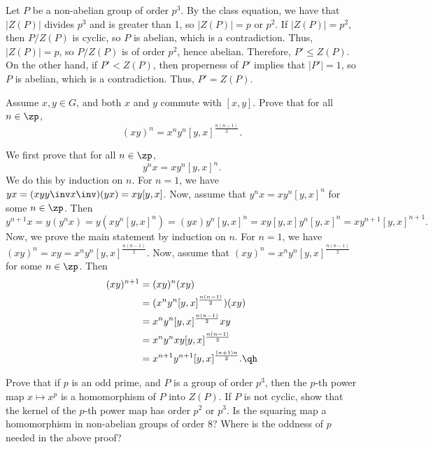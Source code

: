 \begin{sol}
    Let $P$ be a non-abelian group of order $p^3$. By the class equation, we have that $|Z(P)|$ divides $p^3$ and is greater than 1, so $|Z(P)| = p$ or $p^2$. If $|Z(P)| = p^2$, then $P/Z(P)$ is cyclic, so $P$ is abelian, which is a contradiction. Thus, $|Z(P)| = p$, so $P/Z(P)$ is of order $p^2$, hence abelian. Therefore, $P' \leq Z(P)$. On the other hand, if $P' < Z(P)$, then properness of $P'$ implies that $|P'| = 1$, so $P$ is abelian, which is a contradiction. Thus, $P' = Z(P)$.
\end{sol}

\begin{exercise}\label{ex5.4.8}
    Assume $x, y \in G$, and both $x$ and $y$ commute with $[x, y]$. Prove that for all $n \in \zp$,
    \[(xy)^n = x^n y^n [y, x]^{\frac{n(n-1)}{2}}.\]
\end{exercise}

\begin{sol}
    We first prove that for all $n \in \zp$,
    \[y^nx = xy^n [y, x]^n.\]
    We do this by induction on $n$. For $n = 1$, we have $yx = (xyy\inv x\inv)(yx) = xy[y, x]$. Now, assume that $y^nx = xy^n [y, x]^n$ for some $n \in \zp$. Then
    \[y^{n+1}x = y(y^nx) = y(xy^n [y, x]^n) = (yx)y^n [y, x]^n = xy[y, x]y^n [y, x]^n = xy^{n+1} [y, x]^{n+1}.\]
    Now, we prove the main statement by induction on $n$. For $n = 1$, we have $(xy)^n = xy = x^n y^n [y, x]^{\frac{n(n-1)}{2}}$. Now, assume that $(xy)^n = x^n y^n [y, x]^{\frac{n(n-1)}{2}}$ for some $n \in \zp$. Then
    \begin{align*}
        (xy)^{n+1} & = (xy)^n (xy) \\
        & = (x^n y^n [y, x]^{\frac{n(n-1)}{2}})(xy) \\
        & = x^n y^n [y, x]^{\frac{n(n-1)}{2}} x y \\
        & = x^n y^n x y [y, x]^{\frac{n(n-1)}{2}} \\
        & = x^{n+1} y^{n+1} [y, x]^{\frac{(n+1)n}{2}}. \qh
    \end{align*}
\end{sol}

\newpage

\begin{exercise}\label{ex5.4.9}
    Prove that if $p$ is an odd prime, and $P$ is a group of order $p^3$, then the $p$-th power map $x \mapsto x^p$ is a homomorphism of $P$ into $Z(P)$. If $P$ is not cyclic, show that the kernel of the $p$-th power map has order $p^2$ or $p^3$. Is the squaring map a homomorphism in non-abelian groups of order 8? Where is the oddness of $p$ needed in the above proof?
\end{exercise}

